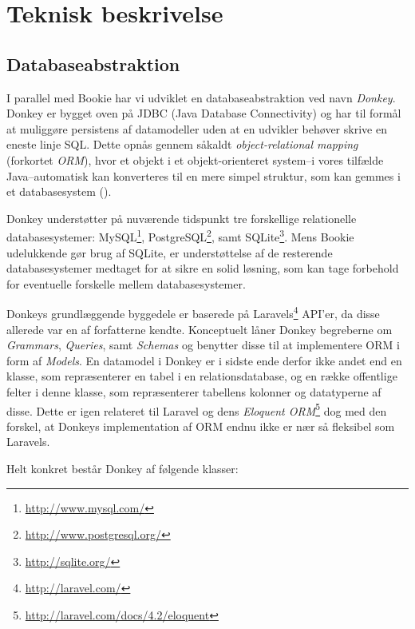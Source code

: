 \chapter{Teknisk beskrivelse}

\section{Databaseabstraktion}

I parallel med Bookie har vi udviklet en databaseabstraktion ved navn \textit{Donkey}. Donkey er bygget oven på JDBC (Java Database Connectivity) og har til formål at muliggøre persistens af datamodeller uden at en udvikler behøver skrive en eneste linje SQL. Dette opnås gennem såkaldt \textit{object-relational mapping} (forkortet \textit{ORM}), hvor et objekt i et objekt-orienteret system–i vores tilfælde Java–automatisk kan konverteres til en mere simpel struktur, som kan gemmes i et databasesystem (\cite{wiki:orm}).

Donkey understøtter på nuværende tidspunkt tre forskellige relationelle databasesystemer: MySQL\footnote{\url{http://www.mysql.com/}}, PostgreSQL\footnote{\url{http://www.postgresql.org/}}, samt SQLite\footnote{\url{http://sqlite.org/}}. Mens Bookie udelukkende gør brug af SQLite, er understøttelse af de resterende databasesystemer medtaget for at sikre en solid løsning, som kan tage forbehold for eventuelle forskelle mellem databasesystemer.

Donkeys grundlæggende byggedele er baserede på Laravels\footnote{\url{http://laravel.com/}} API'er, da disse allerede var en af forfatterne kendte. Konceptuelt låner Donkey begreberne om \textit{Grammars}, \textit{Queries}, samt \textit{Schemas} og benytter disse til at implementere ORM i form af \textit{Models}. En datamodel i Donkey er i sidste ende derfor ikke andet end en klasse, som repræsenterer en tabel i en relationsdatabase, og en række offentlige felter i denne klasse, som repræsenterer tabellens kolonner og datatyperne af disse. Dette er igen relateret til Laravel og dens \textit{Eloquent ORM}\footnote{\url{http://laravel.com/docs/4.2/eloquent}} dog med den forskel, at Donkeys implementation af ORM endnu ikke er nær så fleksibel som Laravels.

Helt konkret består Donkey af følgende klasser:

